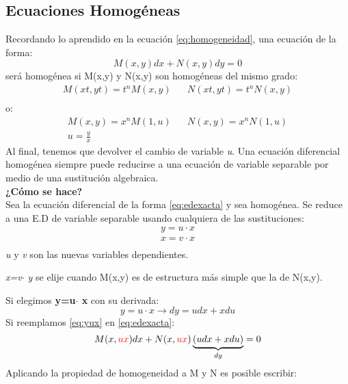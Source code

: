 \documentclass[11pt,fleqn]{book} %
\begin{document}
\subsection{Ecuaciones Homogéneas}
Recordando lo aprendido en la ecuación \ref{eq:homogeneidad}, una ecuación de la forma:
\begin{displaymath}
M(x,y)dx+N(x,y)dy=0
\end{displaymath}
será homogénea si M(x,y) y N(x,y) son homogéneas del mismo grado:
\begin{align*}
M(xt,yt)=t^nM(x,y) \hspace{20pt} N(xt,yt)=t^nN(x,y)\\
\end{align*}
o:
\begin{align*}
M(x,y)=x^nM(1,u) \hspace{20pt} N(x,y)=x^nN(1,u)\\
u=\frac{y}{x}
\end{align*}
Al final, tenemos que devolver el cambio de variable \textit{u}. Una ecuación diferencial homogénea siempre puede reducirse a una ecuación de variable separable por medio de una sustitución algebraica.\\
\textbf{¿Cómo se hace?}\\
Sea la ecuación diferencial de la forma \ref{eq:edexacta} y sea homogénea. Se reduce a una E.D de variable separable usando cualquiera de las sustituciones:
\begin{subequations}
\begin{align}
y=u\cdot x
\label{eq:edhsustituciony} \\
x=v\cdot x
\label{eq:edhsustitucionx} \\
\end{align}
\end{subequations}
\textit{u} y \textit{v} son las nuevas variables dependientes.
\begin{remark}
\textit{x=v$\cdot$ y} se elije cuando M(x,y) es de estructura más simple que la de N(x,y).
\end{remark}
Si elegimos \textbf{y=u$\cdot$ x} con su derivada:
\begin{equation}\label{eq:yux}
y=u\cdot x\longrightarrow dy=udx+xdu
\end{equation}
Si reemplamos \ref{eq:yux} en \ref{eq:edexacta}:
\begin{displaymath}
M(x,\textcolor{red}{ux})dx+N(x,\textcolor{red}{ux})\underbrace{(udx+xdu)}_{dy}=0
\end{displaymath}
Aplicando la propiedad de homogeneidad a M y N es posible escribir:
\end{document}
